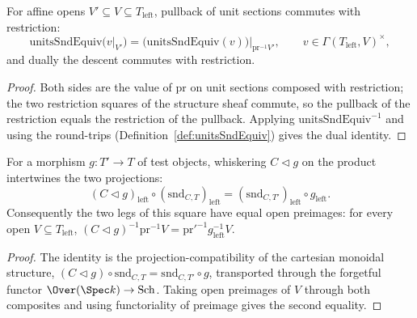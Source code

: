 \begin{lemma}
  \label{lem:unitsSndEquiv_unitsRestrict}
  \leanok
  For affine opens \(V' \subseteq V \subseteq T_{\mathrm{left}}\), pullback of unit sections
  commutes with restriction:
  \[
    \mathrm{unitsSndEquiv}\bigl(v|_{V'}\bigr) = \bigl(\mathrm{unitsSndEquiv}(v)\bigr)
    \big|_{\mathrm{pr}^{-1} V'}, \qquad v \in \Gamma(T_{\mathrm{left}}, V)^{\times},
  \]
  and dually the descent commutes with restriction.
\end{lemma}
\begin{proof}
  \leanok
  Both sides are the value of \(\mathrm{pr}\) on unit sections composed with restriction; the two
  restriction squares of the structure sheaf commute, so the pullback of the restriction equals
  the restriction of the pullback.  Applying \(\mathrm{unitsSndEquiv}^{-1}\) and using the
  round-trips (Definition~\ref{def:unitsSndEquiv}) gives the dual identity.
\end{proof}

\begin{lemma}
  \label{lem:snd_left_naturality}
  \leanok
  For a morphism \(g \colon T' \to T\) of test objects, whiskering \(C \lhd g\) on the product
  intertwines the two projections:
  \[
    (C \lhd g)_{\mathrm{left}} \circ (\mathrm{snd}_{C,T})_{\mathrm{left}}
      = (\mathrm{snd}_{C,T'})_{\mathrm{left}} \circ g_{\mathrm{left}}.
  \]
  Consequently the two legs of this square have equal open preimages: for every open \(V
  \subseteq T_{\mathrm{left}}\), \((C \lhd g)^{-1}\mathrm{pr}^{-1} V = \mathrm{pr}'^{-1}
  g_{\mathrm{left}}^{-1} V\).
\end{lemma}
\begin{proof}
  \leanok
  The identity is the projection-compatibility of the cartesian monoidal structure,
  \((C \lhd g) \circ \mathrm{snd}_{C,T} = \mathrm{snd}_{C,T'} \circ g\), transported through the
  forgetful functor \(\Over(\Spec k) \to \mathrm{Sch}\).  Taking open preimages of \(V\) through
  both composites and using functoriality of preimage gives the second equality.
\end{proof}

